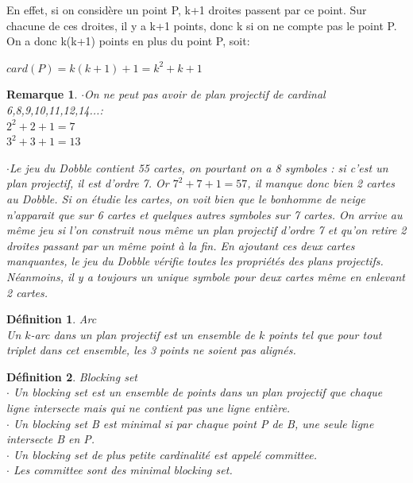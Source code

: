 \documentclass[a4paper]{article}
\newtheorem{Rem}{Remarque}[subsection]
\newtheorem{Def}{Définition}[section]
\begin{document}
\vspace{2\baselineskip}

En effet, si on considère un point P, k+1 droites passent par ce point. Sur chacune de ces droites, il y a k+1 points, donc k si on ne compte pas le point P. On a donc k(k+1) points en plus du point P, soit:
\begin{center}
$card(P)=k(k+1)+1=k^2+k+1$
\end{center}

\begin{Rem}
$\cdot$On ne peut pas avoir de plan projectif de cardinal 6,8,9,10,11,12,14...: \\
$2^2+2+1=7$ \\
  $3^2+3+1=13$\\
  \newpage
  
$\cdot$Le jeu du Dobble contient 55 cartes, on pourtant on a 8 symboles : si c'est un plan projectif, il est d'ordre 7. Or $7^2+7+1=57$, il manque donc bien 2 cartes au Dobble. Si on étudie les cartes, on voit bien que le bonhomme de neige n'apparait que sur 6 cartes et quelques autres symboles sur 7 cartes. On arrive au même jeu si l'on construit nous même un plan projectif d'ordre 7 et qu'on retire 2 droites passant par un même point à la fin. En ajoutant ces deux cartes manquantes, le jeu du Dobble vérifie toutes les propriétés des plans projectifs. Néanmoins, il y a toujours un unique symbole pour deux cartes même en enlevant 2 cartes.
\end{Rem}

\begin{Def}{Arc} \\
  Un $k$-arc dans un plan projectif est un ensemble de $k$ points tel que pour tout triplet dans cet ensemble, les 3 points ne soient pas alignés.
\end{Def}

\begin{Def}{Blocking set}\\
 $\cdot$ Un \textit{blocking set} est un ensemble de points dans un plan projectif que chaque ligne intersecte mais qui ne contient pas une ligne entière.\\
  $\cdot$ Un \textit{blocking set} B est minimal si par chaque point P de B, une seule ligne intersecte B en P.\\
  $\cdot$ Un \textit{blocking set} de plus petite cardinalité est appelé \textit{committee}.\\
 $\cdot$  Les \textit{committee} sont des \textit{minimal blocking set}.
\end{Def}
\end{document}

